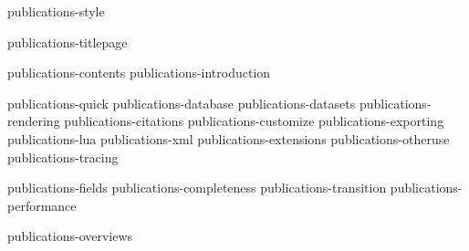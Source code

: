 


%
%
%

\environment publications-style

\startdocument
  [title={Bibliographies},
   subtitle={The \CONTEXT\ way},
   author={Hans Hagen and Alan Braslau}]

\component publications-titlepage

\startfrontmatter
    \component publications-contents
    \component publications-introduction
\stopfrontmatter

\startbodymatter
    \component publications-quick
    \component publications-database
    \component publications-datasets
    \component publications-rendering
    \component publications-citations
    \component publications-customize
    \component publications-exporting
    \component publications-lua
    \component publications-xml
    \component publications-extensions
    \component publications-otheruse
    \component publications-tracing
\stopbodymatter

\startappendices
    \component publications-fields
    \component publications-completeness
    \component publications-transition
    \component publications-performance
\stopappendices

\startbackmatter
    \component publications-overviews
\stopbackmatter

\stopdocument
